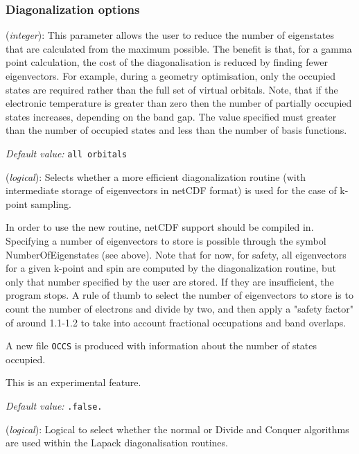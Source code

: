 \documentclass[11pt]{article}
\begin{document}
\subsubsection{Diagonalization options}
\begin{description}
\itemsep 10pt
\parsep 0pt

\item[{\bf NumberOfEigenStates}] ({\it integer}): 
This parameter allows the user to reduce the number of eigenstates
that are calculated from the maximum possible. The benefit is that,
for a gamma point calculation, the cost of the diagonalisation is
reduced by finding fewer eigenvectors. For example, during a geometry
optimisation, only the occupied states are required rather than the
full set of virtual orbitals. Note, that if the electronic temperature
is greater than zero then the number of partially occupied states
increases, depending on the band gap.
The value specified must greater than the number of occupied states
and less than the number of basis functions.

{\it Default value:} {\tt all orbitals}

\item[{\bf Use.New.Diagk}] ({\it logical}): 
Selects whether a more efficient diagonalization routine (with
intermediate storage of eigenvectors in netCDF format) is
used for the case of k-point sampling.

In order to use the new routine, netCDF support should be compiled in.
Specifying a number of eigenvectors to store is possible through
the symbol NumberOfEigenstates (see above). Note that for now, for safety, all
eigenvectors for a given k-point and spin are computed by the
diagonalization routine, but only that number specified by the user
are stored. If they are insufficient, the program stops.  A rule of
thumb to select the number of eigenvectors to store is to count the
number of electrons and divide by two, and then apply a "safety
factor" of around 1.1-1.2 to take into account fractional occupations
and band overlaps.

A new file {\tt OCCS} is produced with information about the number of
states occupied.

This is an experimental feature.

{\it Default value:} {\tt .false.}


\item[{\bf Diag.DivideAndConquer}] ({\it logical}): 
Logical to select whether the normal or Divide and Conquer algorithms are
used within the Lapack diagonalisation routines. 


\end{description}
\end{document}
